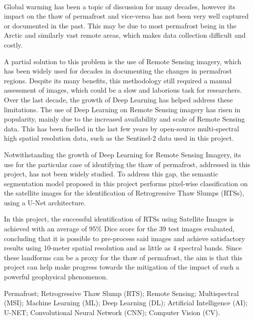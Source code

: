 \paragraph{}
Global warming has been a topic of discussion for many decades, however its impact on the thaw of permafrost and vice-versa has not been very well captured or documented in the past. This may be due to most permafrost being in the Arctic and similarly vast remote areas, which makes data collection difficult and costly.

A partial solution to this problem is the use of Remote Sensing imagery, which has been widely used for decades in documenting the changes in permafrost regions. Despite its many benefits, this methodology still required a manual assessment of images, which could be a slow and laborious task for researchers.
Over the last decade, the growth of Deep Learning has helped address these limitations. The use of Deep Learning on Remote Sensing imagery has risen in popularity, mainly due to the increased availability and scale of Remote Sensing data. This has been fuelled in the last few years by open-source multi-spectral high spatial resolution data, such as the Sentinel-2 data used in this project.

Notwithstanding the growth of Deep Learning for Remote Sensing Imagery, its use for the particular case of identifying the thaw of permafrost, addressed in this project, has not been widely studied. To address this gap, the semantic segmentation model proposed in this project performs pixel-wise classification on the satellite images for the identification of Retrogressive Thaw Slumps (RTSs), using a U-Net architecture.

In this project, the successful identification of RTSs using Satellite Images is achieved with an average of $95\%$ Dice score for the 39 test images evaluated, concluding that it is possible to pre-process said images and achieve satisfactory results using 10-meter spatial resolution and as little as $4$ spectral bands. Since these landforms can be a proxy for the thaw of permafrost, the aim is that this project can help make progress towards the mitigation of the impact of such a powerful geophysical phenomenon.


\begin{keywords}
Permafrost; Retrogressive Thaw Slump (RTS); Remote Sensing; Multispectral (MSI); Machine Learning (ML); Deep Learning (DL); Artificial Intelligence (AI); U-NET; Convolutional Neural Network (CNN); Computer Vision (CV).
\end{keywords} 
